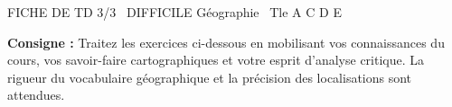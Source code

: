 \documentclass[11pt]{article}
\begin{document}
\begin{tcolorbox}[enhanced,colback=popink,colframe=popink,arc=10pt,boxrule=0pt,left=12pt,right=12pt,top=9pt,bottom=9pt]
{\color{white}\popxbold\small FICHE DE TD 3/3 \textbullet\ DIFFICILE \hfill Géographie \textbullet\ Tle A C D E\par}
\end{tcolorbox}
\vspace{4pt}
\noindent\textbf{Consigne :} Traitez les exercices ci-dessous en mobilisant vos connaissances du cours, vos savoir-faire cartographiques et votre esprit d'analyse critique. La rigueur du vocabulaire géographique et la précision des localisations sont attendues.
\end{document}

